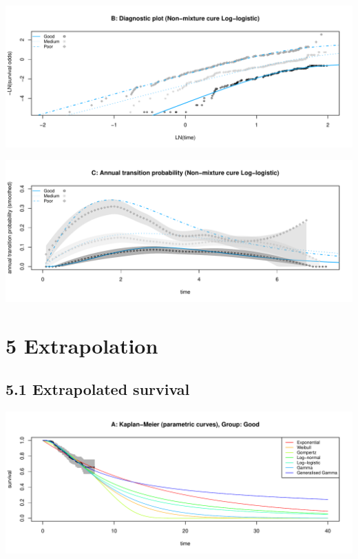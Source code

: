 \documentclass[
]{article}
\begin{document}
\begin{flushleft}\includegraphics[height=0.25\textheight]{BC_OS_output/Images/Figure_cure_models-17} \end{flushleft}

\begin{flushleft}\includegraphics[height=0.25\textheight]{BC_OS_output/Images/Figure_cure_models-18} \end{flushleft}

\clearpage

\section{5 Extrapolation}\label{extrapolation}

\subsection{5.1 Extrapolated survival}\label{extrapolated-survival}

\begin{flushleft}\includegraphics[height=0.29\textheight]{BC_OS_output/Images/Figure_validate_extrapolation_KM-1} \end{flushleft}
\end{document}
